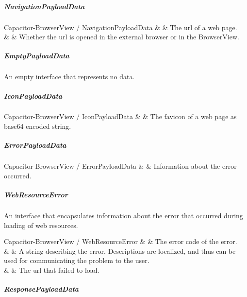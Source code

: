 \subparagraph{NavigationPayloadData}

\begin{interfacedesc}{Capacitor-BrowserView / NavigationPayloadData}
          &   & The \ac{url} of a web page. \\ \hline
   &  & Whether the \ac{url} is opened in the external browser or in the BrowserView. \\ \hline
\end{interfacedesc}

\subparagraph{EmptyPayloadData}

An empty interface that represents no data.


\subparagraph{IconPayloadData}

\begin{interfacedesc}{Capacitor-BrowserView / IconPayloadData}
   &  & The favicon of a web page as base64 encoded string. \\ \hline
\end{interfacedesc}

\subparagraph{ErrorPayloadData}

\begin{interfacedesc}{Capacitor-BrowserView / ErrorPayloadData}
   &  & Information about the error occurred. \\ \hline
\end{interfacedesc}

\subparagraph{WebResourceError}

An interface that encapsulates information about the error that occurred during loading of web resources.

\begin{interfacedesc}{Capacitor-BrowserView / WebResourceError}
          &  & The error code of the error. \\ \hline
   &  & A string describing the error. Descriptions are localized, and thus can be used for communicating the problem to the user. \\ \hline
       &  & The \ac{url} that failed to load. \\ \hline
\end{interfacedesc}

\subparagraph{ResponsePayloadData}

